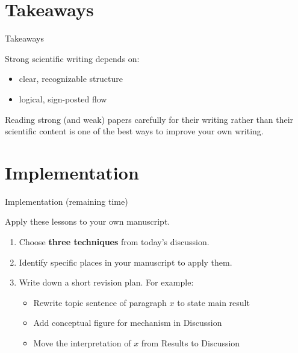 \documentclass{beamer}
\begin{document}
\section{Takeaways}
\begin{frame}{Takeaways}

Strong scientific writing depends on:

\begin{itemize}
\item clear, recognizable structure
\item logical, sign-posted flow
\end{itemize}

\vspace{0.4cm}

Reading strong (and weak) papers carefully for their writing rather than their scientific content
is one of the best ways to improve your own writing.

\end{frame}
\section{Implementation}
\begin{frame}{Implementation (remaining time)}

Apply these lessons to your own manuscript.

\begin{enumerate}
    \item  Choose \textbf{three techniques} from today's discussion.
    \item  Identify specific places in your manuscript to apply them.
    \item  Write down a short revision plan. For example:
        \begin{itemize}
            \item Rewrite topic sentence of paragraph $x$ to state main result
            \item Add conceptual figure for mechanism in Discussion
            \item Move the interpretation of $x$ from Results to Discussion
        \end{itemize}
\end{enumerate}

\end{frame}
\end{document}
